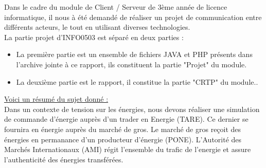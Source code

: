 Dans le cadre du module de Client / Serveur de 3ème année de licence informatique, il nous à été demandé de réaliser un projet  de communication entre différents acteurs, le tout en utilisant diverses technologies.
\\[1cm]
La partie projet d'INFO0503 est séparé en deux parties :
\begin{itemize}
    \item La première partie est un ensemble de fichiers JAVA et PHP présents dans l'archive jointe à ce rapport, ils constituent la partie "Projet" du module.
    \item La deuxième partie est le rapport, il constitue la partie "CRTP" du module..\\[1cm]
\end{itemize}


\underline{Voici un résumé du sujet donné :}
\\[5mm]

Dans un contexte de tension sur les énergies, nous devons réaliser une simulation de commande d'énergie auprès d'un trader en Energie (TARE). Ce dernier se fournira en énergie auprès du marché de gros. Le marché de gros reçoit des énergies en permanance d'un producteur d'énergie (PONE). L'Autorité des Marchés Internationaux  (AMI) régit l'ensemble du trafic de l'energie et assure l'authenticité des énergies transférées.
\newpage
